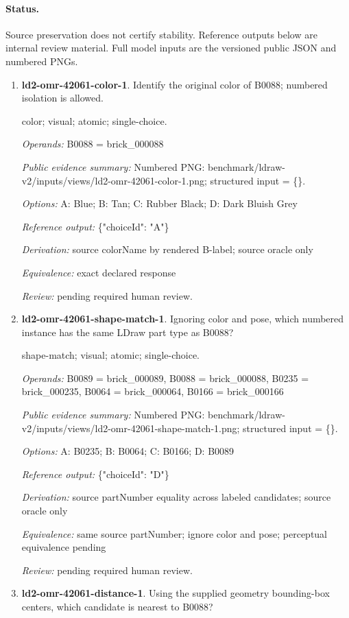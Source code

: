 \paragraph{Status.}Source preservation does not certify stability. Reference outputs below are internal review material. Full model inputs are the versioned public JSON and numbered PNGs.
\begin{enumerate}
\item \textbf{ld2-omr-42061-color-1}. Identify the original color of B0088; numbered isolation is allowed.
\par{\small color; visual; atomic; single-choice.\par\textit{Operands:} B0088 = brick\_000088\par\textit{Public evidence summary:} Numbered PNG: benchmark/ldraw-v2/inputs/views/ld2-omr-42061-color-1.png; structured input = \{\}.\par\textit{Options:} A: Blue; B: Tan; C: Rubber Black; D: Dark Bluish Grey\par\textit{Reference output:} \{"choiceId": "A"\}\par\textit{Derivation:} source colorName by rendered B-label; source oracle only\par\textit{Equivalence:} exact declared response\par\textit{Review:} pending required human review.}
\item \textbf{ld2-omr-42061-shape-match-1}. Ignoring color and pose, which numbered instance has the same LDraw part type as B0088?
\par{\small shape-match; visual; atomic; single-choice.\par\textit{Operands:} B0089 = brick\_000089, B0088 = brick\_000088, B0235 = brick\_000235, B0064 = brick\_000064, B0166 = brick\_000166\par\textit{Public evidence summary:} Numbered PNG: benchmark/ldraw-v2/inputs/views/ld2-omr-42061-shape-match-1.png; structured input = \{\}.\par\textit{Options:} A: B0235; B: B0064; C: B0166; D: B0089\par\textit{Reference output:} \{"choiceId": "D"\}\par\textit{Derivation:} source partNumber equality across labeled candidates; source oracle only\par\textit{Equivalence:} same source partNumber; ignore color and pose; perceptual equivalence pending\par\textit{Review:} pending required human review.}
\item \textbf{ld2-omr-42061-distance-1}. Using the supplied geometry bounding-box centers, which candidate is nearest to B0088?

\end{enumerate}
